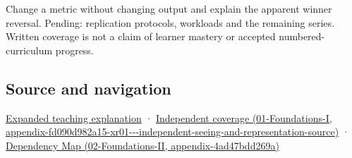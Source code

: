 Change a metric without changing output and explain the apparent winner reversal. Pending: replication protocols, workloads and the remaining series. Written coverage is not a claim of learner mastery or accepted numbered-curriculum progress.

\subsection{Source and navigation}\label{appendix-65788587ef78-source-and-navigation}

\href{Continuous\%20Notes/University\%20-\%20Worlds,\%20Images\%20and\%20Inference\%20-\%20Graphics,\%20Vision\%20and\%20Photography\#Make\%20the\%20mathematics\%20operational\%20without\%20pretending\%20to\%20run\%20a\%20human\%20study}{Expanded teaching explanation} · \href{../01-Foundations-I/main.pdf\#nameddest=appendix-fd090d982a15-xr01---independent-seeing-and-representation-source}{Independent coverage (01-Foundations-I, appendix-fd090d982a15-xr01-\/-\/-independent-seeing-and-representation-source)} · \href{../02-Foundations-II/main.pdf\#nameddest=appendix-4ad47bdd269a}{Dependency Map (02-Foundations-II, appendix-4ad47bdd269a)}
